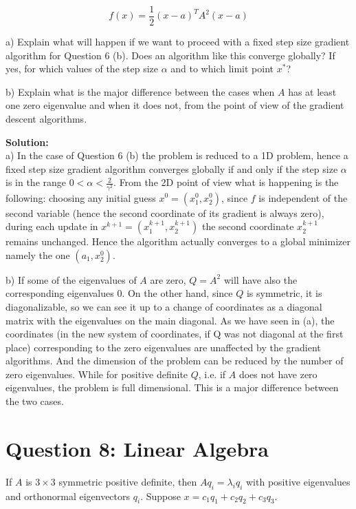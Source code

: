 \documentclass[12pt]{article}
\begin{document}
	\begin{equation}
		f(x) = \frac{1}{2}(x-a)^TA^2(x-a)
	\end{equation}
	
	a) Explain what will happen if we want to proceed with a fixed step size gradient algorithm for Question 6 (b). Does an algorithm like this converge globally? If yes, for which values of the step size $\alpha$ and to which limit point $x^*$?
	
	b) Explain what is the major difference between the cases when $A$ has at least one zero eigenvalue and when it does not, from the point of view of the gradient descent algorithms.
	
	\begin{framed}
		\textbf{Solution:}\\
		a) In the case of Question 6 (b) the problem is reduced to a 1D problem, hence a fixed step size gradient algorithm converges globally if and only if the step size $\alpha$ is in the range $0 < \alpha < \frac{2}{\gamma^2}$. From the 2D point of view what is happening is the following: choosing any initial guess $x^0 = (x^0_1, x^0_2)$, since $f$ is independent of the second variable (hence the second coordinate of its gradient is always zero), during each update in $x^{k+1} = (x^{k+1}_1,x^{k+1}_2)$ the second coordinate $x_2^{k+1}$ remains unchanged. Hence the algorithm actually converges to a global minimizer namely the one $(a_1,x_2^0)$.
		
		b) If some of the eigenvalues of $A$ are zero, $Q = A^2$ will have also the corresponding eigenvalues 0. On the other hand, since $Q$ is symmetric, it is diagonalizable, so we can see it up to a change of coordinates as a diagonal matrix with the eigenvalues on the main diagonal. As we have seen in (a), the coordinates (in the new system of coordinates, if Q was not diagonal at the first place) corresponding to the zero eigenvalues are unaffected by the gradient algorithms. And the dimension of the problem can be reduced by the number of zero eigenvalues. While for positive definite $Q$, i.e. if $A$ does not have zero eigenvalues, the problem is full dimensional. This is a major difference between the two cases.
	\end{framed}
	
	\section*{Question 8: Linear Algebra}
	If $A$ is $3 \times 3$ symmetric positive definite, then $Aq_i = \lambda_i q_i$ with positive eigenvalues and orthonormal eigenvectors $q_i$. Suppose $x = c_1q_1 + c_2q_2 + c_3q_3$.
	
\end{document}
